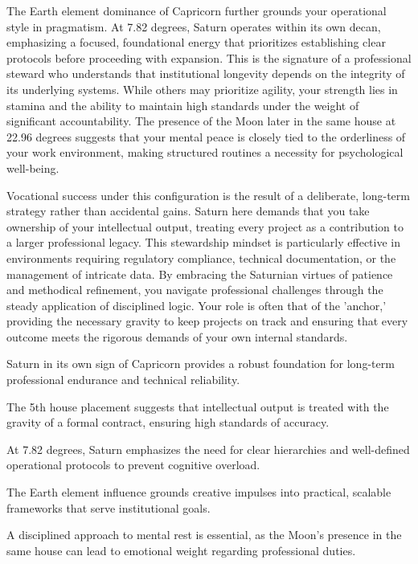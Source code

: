 {\fontsize{9}{13}\selectfont The Earth element dominance of Capricorn further grounds your operational style in pragmatism. At 7.82 degrees, Saturn operates within its own decan, emphasizing a focused, foundational energy that prioritizes establishing clear protocols before proceeding with expansion. This is the signature of a professional steward who understands that institutional longevity depends on the integrity of its underlying systems. While others may prioritize agility, your strength lies in stamina and the ability to maintain high standards under the weight of significant accountability. The presence of the Moon later in the same house at 22.96 degrees suggests that your mental peace is closely tied to the orderliness of your work environment, making structured routines a necessity for psychological well-being.}\par\vspace{1.8mm}

{\fontsize{9}{13}\selectfont Vocational success under this configuration is the result of a deliberate, long-term strategy rather than accidental gains. Saturn here demands that you take ownership of your intellectual output, treating every project as a contribution to a larger professional legacy. This stewardship mindset is particularly effective in environments requiring regulatory compliance, technical documentation, or the management of intricate data. By embracing the Saturnian virtues of patience and methodical refinement, you navigate professional challenges through the steady application of disciplined logic. Your role is often that of the 'anchor,' providing the necessary gravity to keep projects on track and ensuring that every outcome meets the rigorous demands of your own internal standards.}\par\vspace{1.8mm}

\begin{diamondlist}
  \item {\fontsize{8.5}{12}\selectfont Saturn in its own sign of Capricorn provides a robust foundation for long-term professional endurance and technical reliability.}
  \item {\fontsize{8.5}{12}\selectfont The 5th house placement suggests that intellectual output is treated with the gravity of a formal contract, ensuring high standards of accuracy.}
  \item {\fontsize{8.5}{12}\selectfont At 7.82 degrees, Saturn emphasizes the need for clear hierarchies and well-defined operational protocols to prevent cognitive overload.}
  \item {\fontsize{8.5}{12}\selectfont The Earth element influence grounds creative impulses into practical, scalable frameworks that serve institutional goals.}
  \item {\fontsize{8.5}{12}\selectfont A disciplined approach to mental rest is essential, as the Moon's presence in the same house can lead to emotional weight regarding professional duties.}
\end{diamondlist}

